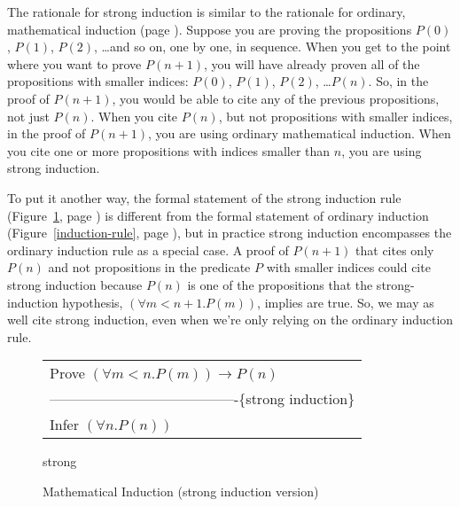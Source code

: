 \label{strong-induction-rationale}
The rationale for
strong induction is similar to
the rationale for ordinary, mathematical induction (page \pageref{induction-rationale}).
Suppose you are proving the propositions
$P(0)$, $P(1)$, $P(2)$, \dots and so on,
one by one, in sequence.
When you get to the point where you want to prove $P(n+1)$,
you will have already proven all of the propositions
with smaller indices:
$P(0)$, $P(1)$, $P(2)$, \dots $P(n)$.
So, in the proof of $P(n+1)$, you would be able to
cite any of the previous propositions, not just $P(n)$.
When you cite $P(n)$, but not propositions with smaller indices,
in the proof of $P(n+1)$, you are using ordinary mathematical induction.
When you cite one or more propositions with indices smaller than $n$,
you are using strong induction.

To put it another way, the formal statement of the strong induction rule
(Figure~\ref{strong-induction-rule}, page \pageref{strong-induction-rule})
is different from the formal statement of ordinary induction
(Figure~\ref{induction-rule}, page \pageref{induction-rule}), but
in practice strong induction encompasses the ordinary induction rule
as a special case. A proof of $P(n+1)$ that cites only $P(n)$
and not propositions in the predicate $P$ with smaller indices
could cite strong induction because $P(n)$ is one of the propositions
that the strong-induction hypothesis, $(\forall m<n+1.P(m))$, implies are true.
So, we may as well cite strong induction, even when we're only relying
on the ordinary induction rule.

\begin{figure}
\begin{center}
\begin{tabular}{l}
Prove $(\forall m<n.P(m))\rightarrow P(n)$ \\
----------------------------------------\{strong induction\}\\
Infer $(\forall n.P(n))$
\end{tabular}
\end{center}
strong
\caption{Mathematical Induction (strong induction version)}
\label{strong-induction-rule}
\end{figure}

